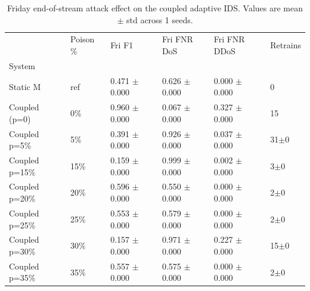 \begin{table}
\caption{Friday end-of-stream attack effect on the coupled adaptive IDS. Values are mean $\pm$ std across 1 seeds.}
\label{tab:attack-fri-summary-ddos}
\begin{tabular}{llllll}
\toprule
 & Poison \% & Fri F1 & Fri FNR DoS & Fri FNR DDoS & Retrains \\
System &  &  &  &  &  \\
\midrule
Static M & ref & 0.471 $\pm$ 0.000 & 0.626 $\pm$ 0.000 & 0.000 $\pm$ 0.000 & 0 \\
Coupled (p=0) & 0\% & 0.960 $\pm$ 0.000 & 0.067 $\pm$ 0.000 & 0.327 $\pm$ 0.000 & 15 \\
Coupled p=5\% & 5\% & 0.391 $\pm$ 0.000 & 0.926 $\pm$ 0.000 & 0.037 $\pm$ 0.000 & 31$\pm$0 \\
Coupled p=15\% & 15\% & 0.159 $\pm$ 0.000 & 0.999 $\pm$ 0.000 & 0.002 $\pm$ 0.000 & 3$\pm$0 \\
Coupled p=20\% & 20\% & 0.596 $\pm$ 0.000 & 0.550 $\pm$ 0.000 & 0.000 $\pm$ 0.000 & 2$\pm$0 \\
Coupled p=25\% & 25\% & 0.553 $\pm$ 0.000 & 0.579 $\pm$ 0.000 & 0.000 $\pm$ 0.000 & 2$\pm$0 \\
Coupled p=30\% & 30\% & 0.157 $\pm$ 0.000 & 0.971 $\pm$ 0.000 & 0.227 $\pm$ 0.000 & 15$\pm$0 \\
Coupled p=35\% & 35\% & 0.557 $\pm$ 0.000 & 0.575 $\pm$ 0.000 & 0.000 $\pm$ 0.000 & 2$\pm$0 \\
\bottomrule
\end{tabular}
\end{table}
